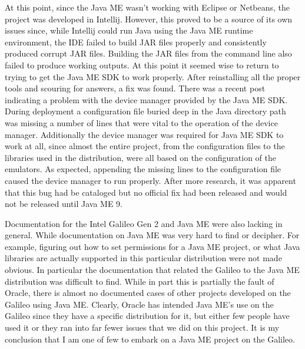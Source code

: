 At this point, since the Java ME wasn't working with Eclipse or Netbeans, the project was developed in Intellij. However, this proved to be a source of its own issues since, while Intellij could run Java using the Java ME runtime environment, the IDE failed to build JAR files properly and consistently produced corrupt JAR files. Building the JAR files from the command line also failed to produce working outputs. At this point it seemed wise to return to trying to get the Java ME SDK to work properly. After reinstalling all the proper tools and scouring for answers, a fix was found. There was a recent post indicating a problem with the device manager provided by the Java ME SDK. During deployment a configuration file buried deep in the Java directory path was missing a number of lines that were vital to the operation of the device manager. Additionally the device manager was required for Java ME SDK to work at all, since almost the entire project, from the configuration files to the libraries used in the distribution, were all based on the configuration of the emulators. As expected, appending the missing lines to the configuration file caused the device manager to run properly. After more research, it was apparent that this bug had be cataloged but no official fix had been released and would not be released until Java ME 9.  

Documentation for the Intel Galileo Gen 2  and Java ME were also lacking in general. While documentation on Java ME was very hard to find or decipher. For example, figuring out how to set permissions for a Java ME project, or what Java libraries are actually supported in this particular distribution were not made obvious. In particular the documentation that related the Galileo to the Java ME distribution was difficult to find. While in part this is partially the fault of Oracle, there is almost no documented cases of other projects developed on the Galileo using Java ME. Clearly, Oracle has intended Java ME's use on the Galileo since they have a specific distribution for it, but either few people have used it or they ran into far fewer issues that we did on this project. It is my conclusion that I am one of few to embark on a Java ME project on the Galileo. 
